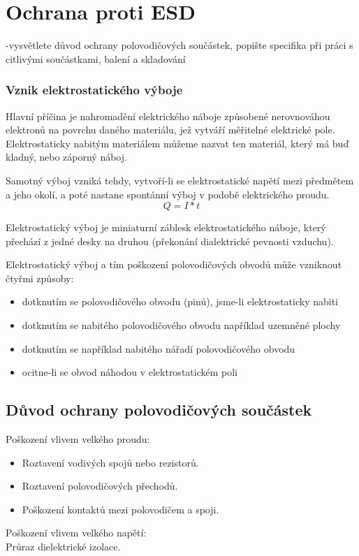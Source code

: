 \section{Ochrana proti ESD}
-vysvětlete důvod ochrany polovodičových součástek, popište
specifika při práci s citlivými součástkami, balení a skladování


\subsubsection{Vznik elektrostatického výboje}

Hlavní příčina je nahromadění elektrického náboje způsobené nerovnováhou elektronů na
povrchu daného materiálu, jež vytváří měřitelné elektrické pole. Elektrostaticky nabitým
materiálem můžeme nazvat ten materiál, který má buď kladný, nebo záporný náboj.

Samotný výboj vzniká tehdy, vytvoří-li se elektrostatické napětí mezi předmětem a jeho okolí, a poté nastane spontánní výboj v podobě elektrického proudu.
\begin{equation}
Q= I*t
\end{equation}

Elektrostatický výboj je miniaturní záblesk elektrostatického náboje, který přechází z jedné
desky na druhou (překonání dialektrické pevnosti vzduchu).

Elektrostatický výboj a tím poškození polovodičových obvodů může vzniknout čtyřmi způsoby:
\begin{itemize}
\item dotknutím se polovodičového obvodu (pinů), jsme-li elektrostaticky nabiti
\item dotknutím se nabitého polovodičového obvodu například uzemněné plochy
\item dotknutím se například nabitého nářadí polovodičového obvodu
\item ocitne-li se obvod náhodou v elektrostatickém poli
\end{itemize}


\subsection{Důvod ochrany polovodičových součástek}
Poškození vlivem velkého proudu:
\begin{itemize}
\item Roztavení vodivých spojů nebo rezistorů.
\item Roztavení polovodičových přechodů.
\item Poškození kontaktů mezi polovodičem a spoji.
\end{itemize}
Poškození vlivem velkého napětí:\\
Průraz dielektrické izolace.

